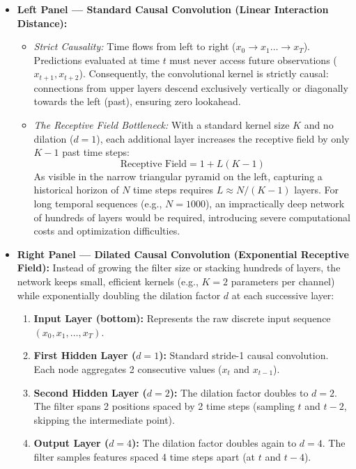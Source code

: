 \begin{itemize}[leftmargin=*]
    \item \textbf{Left Panel --- Standard Causal Convolution (Linear Interaction Distance):}
    \begin{itemize}[nosep]
        \item \textit{Strict Causality:} Time flows from left to right ($x_0 \to x_1 \dots \to x_T$). Predictions evaluated at time $t$ must never access future observations ($x_{t+1}, x_{t+2}$). Consequently, the convolutional kernel is strictly causal: connections from upper layers descend exclusively vertically or diagonally towards the left (past), ensuring zero lookahead.
        \item \textit{The Receptive Field Bottleneck:} With a standard kernel size $K$ and no dilation ($d=1$), each additional layer increases the receptive field by only $K-1$ past time steps:
        \[ \text{Receptive Field} = 1 + L(K - 1) \]
        As visible in the narrow triangular pyramid on the left, capturing a historical horizon of $N$ time steps requires $L \approx N / (K - 1)$ layers. For long temporal sequences (e.g., $N = 1000$), an impractically deep network of hundreds of layers would be required, introducing severe computational costs and optimization difficulties.
    \end{itemize}

    \item \textbf{Right Panel --- Dilated Causal Convolution (Exponential Receptive Field):}
    Instead of growing the filter size or stacking hundreds of layers, the network keeps small, efficient kernels (e.g., $K=2$ parameters per channel) while exponentially doubling the dilation factor $d$ at each successive layer:
    \begin{enumerate}[nosep]
        \item \textbf{Input Layer (bottom):} Represents the raw discrete input sequence $(x_0, x_1, \dots, x_T)$.
        \item \textbf{First Hidden Layer ($d = 1$):} Standard stride-1 causal convolution. Each node aggregates 2 consecutive values ($x_t$ and $x_{t-1}$).
        \item \textbf{Second Hidden Layer ($d = 2$):} The dilation factor doubles to $d=2$. The filter spans 2 positions spaced by 2 time steps (sampling $t$ and $t-2$, skipping the intermediate point).
        \item \textbf{Output Layer ($d = 4$):} The dilation factor doubles again to $d=4$. The filter samples features spaced 4 time steps apart (at $t$ and $t-4$).
    \end{enumerate}


\end{itemize}

